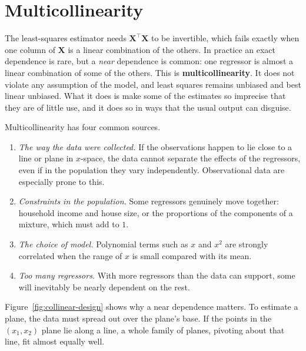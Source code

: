 \documentclass[11pt,a4paper]{article}
\numberwithin{equation}{section}
\theoremstyle{definition}
\begin{document}
\section{Multicollinearity}
The least-squares estimator needs $\mathbf{X}^\top\mathbf{X}$ to be invertible, which fails exactly when
one column of $\mathbf{X}$ is a linear combination of the others. In practice an exact dependence is
rare, but a \emph{near} dependence is common: one regressor is almost a linear combination of some
of the others. This is \textbf{multicollinearity}. It does not violate any assumption of the model,
and least squares remains unbiased and best linear unbiased. What it does is make some of the
estimates so imprecise that they are of little use, and it does so in ways that the usual output can
disguise.

Multicollinearity has four common sources.
\begin{enumerate}[label=(\roman*)]
\item \emph{The way the data were collected.} If the observations happen to lie close to a
line or plane in $x$-space, the data cannot separate the effects of the regressors, even if in
the population they vary independently. Observational data are especially prone to this.
\item \emph{Constraints in the population.} Some regressors genuinely move together: household
income and house size, or the proportions of the components of a mixture, which must add to
$1$.
\item \emph{The choice of model.} Polynomial terms such as $x$ and $x^2$ are strongly correlated when
the range of $x$ is small compared with its mean.
\item \emph{Too many regressors.} With more regressors than the data can support, some will
inevitably be nearly dependent on the rest.
\end{enumerate}

Figure~\ref{fig:collinear-design} shows why a near dependence matters. To estimate a plane, the
data must spread out over the plane's base. If the points in the $(x_1, x_2)$ plane lie along a line,
a whole family of planes, pivoting about that line, fit almost equally well.
\end{document}
